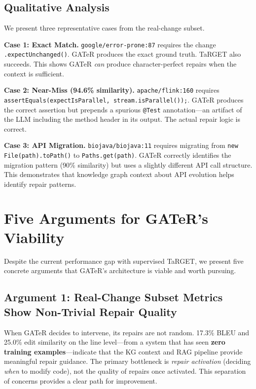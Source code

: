\documentclass[conference,10pt]{IEEEtran}
\begin{document}
\subsection{Qualitative Analysis}

We present three representative cases from the real-change subset.

\textbf{Case 1: Exact Match.}
\texttt{google/error-prone:87} requires the change
\texttt{.expectUnchanged()}.  GATeR produces the exact ground truth.
TaRGET also succeeds.  This shows GATeR \emph{can} produce
character-perfect repairs when the context is sufficient.

\textbf{Case 2: Near-Miss (94.6\% similarity).}
\texttt{apache/flink:160} requires
\texttt{assertEquals(expectIsParallel, stream.isParallel());}. GATeR
produces the correct assertion but prepends a spurious \texttt{@Test}
annotation---an artifact of the LLM including the method header in
its output.  The actual repair logic is correct.

\textbf{Case 3: API Migration.}
\texttt{biojava/biojava:11} requires migrating from
\texttt{new File(path).toPath()} to \texttt{Paths.get(path)}.  GATeR
correctly identifies the migration pattern (90\% similarity) but uses
a slightly different API call structure.  This demonstrates that
knowledge graph context about API evolution helps identify repair
patterns.

\section{Five Arguments for GATeR's Viability}
\label{sec:arguments}

Despite the current performance gap with supervised TaRGET, we present
five concrete arguments that GATeR's architecture is viable and worth
pursuing.

\subsection{Argument 1: Real-Change Subset Metrics Show Non-Trivial
Repair Quality}

When GATeR decides to intervene, its repairs are not random.  17.3\%
BLEU and 25.0\% edit similarity on the line level---from a system that
has seen \textbf{zero training examples}---indicate that the KG context
and RAG pipeline provide meaningful repair guidance.  The primary
bottleneck is \emph{repair activation} (deciding \emph{when} to modify
code), not the quality of repairs once activated.  This separation of
concerns provides a clear path for improvement.
\end{document}
